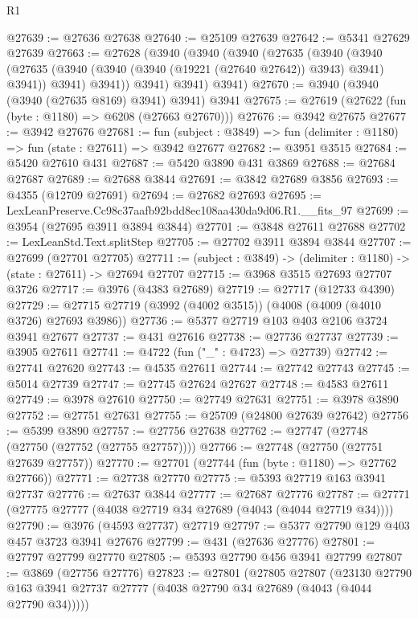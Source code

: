 \begin{lexlean}{R1}
\begin{coremodule}
@27639 := @27636 @27638
@27640 := @25109 @27639
@27642 := @5341 @27629 @27639
@27663 := @27628
    (@3940
      (@3940
        (@3940
          (@27635
            (@3940
              (@3940
                (@27635 (@3940 (@3940 (@3940 (@19221 (@27640 @27642)) @3943) @3941) @3941))
                @3941)
              @3941))
          @3941)
        @3941)
      @3941)
@27670 := @3940 (@3940 (@3940 (@27635 @8169) @3941) @3941) @3941
@27675 := @27619 (@27622 (fun (byte : @1180) => @6208 (@27663 @27670)))
@27676 := @3942 @27675
@27677 := @3942 @27676
@27681 := fun (subject : @3849) => fun (delimiter : @1180) => fun (state : @27611) => @3942 @27677
@27682 := @3951 @3515
@27684 := @5420 @27610 @431
@27687 := @5420 @3890 @431 @3869
@27688 := @27684 @27687
@27689 := @27688 @3844
@27691 := @3842 @27689 @3856
@27693 := @4355 (@12709 @27691)
@27694 := @27682 @27693
@27695 := LexLeanPreserve.Cc98c37aafb92bdd8ec108aa430da9d06.R1.__fits_97
@27699 := @3954 (@27695 @3911 @3894 @3844)
@27701 := @3848 @27611 @27688
@27702 := LexLeanStd.Text.splitStep
@27705 := @27702 @3911 @3894 @3844
@27707 := @27699 (@27701 @27705)
@27711 := (subject : @3849) -> (delimiter : @1180) -> (state : @27611) -> @27694 @27707
@27715 := @3968 @3515 @27693 @27707 @3726
@27717 := @3976 (@4383 @27689)
@27719 := @27717 (@12733 @4390)
@27729 := @27715 @27719 (@3992 (@4002 @3515)) (@4008 (@4009 (@4010 @3726) @27693 @3986))
@27736 := @5377 @27719 @103 @403 @2106 @3724 @3941 @27677
@27737 := @431 @27616
@27738 := @27736 @27737
@27739 := @3905 @27611
@27741 := @4722 (fun ("_" : @4723) => @27739)
@27742 := @27741 @27620
@27743 := @4535 @27611
@27744 := @27742 @27743
@27745 := @5014 @27739
@27747 := @27745 @27624 @27627
@27748 := @4583 @27611
@27749 := @3978 @27610
@27750 := @27749 @27631
@27751 := @3978 @3890
@27752 := @27751 @27631
@27755 := @25709 (@24800 @27639 @27642)
@27756 := @5399 @3890
@27757 := @27756 @27638
@27762 := @27747 (@27748 (@27750 (@27752 (@27755 @27757))))
@27766 := @27748 (@27750 (@27751 @27639 @27757))
@27770 := @27701 (@27744 (fun (byte : @1180) => @27762 @27766))
@27771 := @27738 @27770
@27775 := @5393 @27719 @163 @3941 @27737
@27776 := @27637 @3844
@27777 := @27687 @27776
@27787 := @27771 (@27775 @27777 (@4038 @27719 @34 @27689 (@4043 (@4044 @27719 @34))))
@27790 := @3976 (@4593 @27737) @27719
@27797 := @5377 @27790 @129 @403 @457 @3723 @3941 @27676
@27799 := @431 (@27636 @27776)
@27801 := @27797 @27799 @27770
@27805 := @5393 @27790 @456 @3941 @27799
@27807 := @3869 (@27756 @27776)
@27823 := @27801
    (@27805
      @27807
      (@23130 @27790 @163 @3941 @27737 @27777 (@4038 @27790 @34 @27689 (@4043 (@4044 @27790 @34)))))

\end{coremodule}
\end{lexlean}
